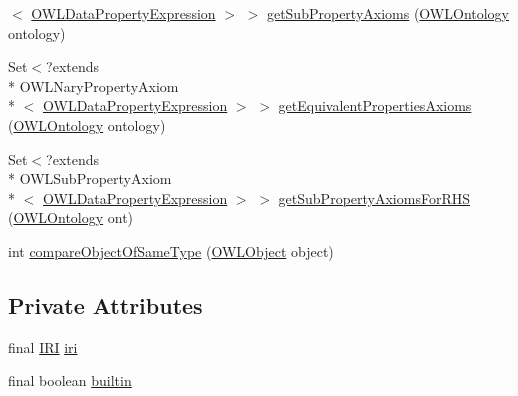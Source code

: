 \begin{DoxyCompactItemize}
$<$ \hyperlink{interfaceorg_1_1semanticweb_1_1owlapi_1_1model_1_1_o_w_l_data_property_expression}{O\-W\-L\-Data\-Property\-Expression} $>$ $>$ \hyperlink{classuk_1_1ac_1_1manchester_1_1cs_1_1owl_1_1owlapi_1_1_o_w_l_data_property_impl_a04a42eb0ad0402f944984600bd2a4085}{get\-Sub\-Property\-Axioms} (\hyperlink{interfaceorg_1_1semanticweb_1_1owlapi_1_1model_1_1_o_w_l_ontology}{O\-W\-L\-Ontology} ontology)
\item 
Set$<$?extends \\*
O\-W\-L\-Nary\-Property\-Axiom\\*
$<$ \hyperlink{interfaceorg_1_1semanticweb_1_1owlapi_1_1model_1_1_o_w_l_data_property_expression}{O\-W\-L\-Data\-Property\-Expression} $>$ $>$ \hyperlink{classuk_1_1ac_1_1manchester_1_1cs_1_1owl_1_1owlapi_1_1_o_w_l_data_property_impl_ace25da0f236a8a3074cb6dc9450466c4}{get\-Equivalent\-Properties\-Axioms} (\hyperlink{interfaceorg_1_1semanticweb_1_1owlapi_1_1model_1_1_o_w_l_ontology}{O\-W\-L\-Ontology} ontology)
\item 
Set$<$?extends \\*
O\-W\-L\-Sub\-Property\-Axiom\\*
$<$ \hyperlink{interfaceorg_1_1semanticweb_1_1owlapi_1_1model_1_1_o_w_l_data_property_expression}{O\-W\-L\-Data\-Property\-Expression} $>$ $>$ \hyperlink{classuk_1_1ac_1_1manchester_1_1cs_1_1owl_1_1owlapi_1_1_o_w_l_data_property_impl_a73e1009c31fff53de6701f5916c8f713}{get\-Sub\-Property\-Axioms\-For\-R\-H\-S} (\hyperlink{interfaceorg_1_1semanticweb_1_1owlapi_1_1model_1_1_o_w_l_ontology}{O\-W\-L\-Ontology} ont)
\item 
int \hyperlink{classuk_1_1ac_1_1manchester_1_1cs_1_1owl_1_1owlapi_1_1_o_w_l_data_property_impl_aea3019b8dd14c946998da3f7d2f77476}{compare\-Object\-Of\-Same\-Type} (\hyperlink{interfaceorg_1_1semanticweb_1_1owlapi_1_1model_1_1_o_w_l_object}{O\-W\-L\-Object} object)
\end{DoxyCompactItemize}
\subsection*{Private Attributes}
\begin{DoxyCompactItemize}
\item 
final \hyperlink{classorg_1_1semanticweb_1_1owlapi_1_1model_1_1_i_r_i}{I\-R\-I} \hyperlink{classuk_1_1ac_1_1manchester_1_1cs_1_1owl_1_1owlapi_1_1_o_w_l_data_property_impl_aac4bb129053e0f09d194836a8e0caa0c}{iri}
\item 
final boolean \hyperlink{classuk_1_1ac_1_1manchester_1_1cs_1_1owl_1_1owlapi_1_1_o_w_l_data_property_impl_a3387a10715f7fe8ee3c427899c938e42}{builtin}
\end{DoxyCompactItemize}
